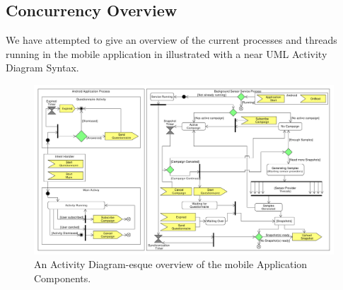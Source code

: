 \subsection{Concurrency Overview}
We have attempted to give an overview of the current processes and threads running in the mobile application in  illustrated with a near UML Activity Diagram Syntax. 

\begin{figure}[!htbp]
    \centering
    \includegraphics[width=\textwidth]{graphic/backgroundsensorservice/lifecyclestuff.pdf}
    \caption{An Activity Diagram-esque overview of the mobile Application Components.}
    \label{fig:system_currency_and_lifecycle}
\end{figure}
\FloatBarrier